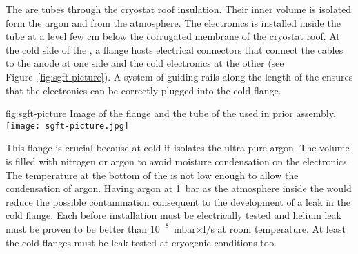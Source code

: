 The  are tubes through the cryostat roof insulation.
Their inner volume is isolated form the argon and from the atmosphere.
The electronics is installed inside the tube at a level few cm below the corrugated membrane of the cryostat roof.
At the cold side of the , a flange hosts electrical connectors that connect the cables to the anode at one side and the cold electronics at the other (see Figure~\ref{fig:sgft-picture}).
A system of guiding rails along the length of the  ensures that the electronics can be correctly plugged into the cold flange.
\begin{dunefigure}{fig:sgft-picture}
{Image of the flange and the tube of the  used in  prior assembly.}
\texttt{[image: sgft-picture.jpg]}
\end{dunefigure}
This flange is crucial because at cold it isolates the ultra-pure argon.
The  volume is filled with nitrogen or argon to avoid moisture condensation on the electronics.
The temperature at the bottom of the  is not low enough to allow the condensation of argon.
Having argon at 1~bar as the atmosphere inside the  would reduce the possible  contamination consequent to the development of a leak in the cold flange.
Each  before installation must be electrically tested and helium leak must be proven to be better than $10^{-8}$~mbar$\times$l/s at room temperature.
At least the cold flanges must be leak tested at cryogenic conditions too.




